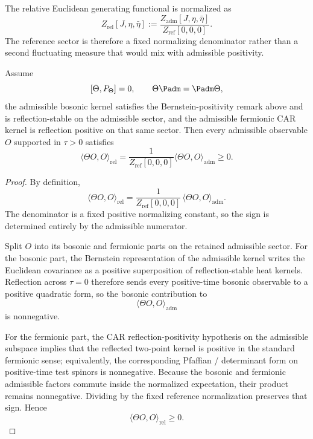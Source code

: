 \begin{definition}
\label{def:relative-generating-functional}
The relative Euclidean generating functional is normalized as
\[
Z_{\mathrm{rel}}[J,\eta,\bar\eta]
:=
\frac{Z_{\mathrm{adm}}[J,\eta,\bar\eta]}{Z_{\mathrm{ref}}[0,0,0]}.
\]
The reference sector is therefore a fixed normalizing denominator rather than a second fluctuating measure that would mix with admissible positivity.
\end{definition}

\begin{lemma}
\label{lem:admissible-reflection-positivity}
Assume
\[
[\Theta,P_\Theta]=0,
\qquad
\Theta\Padm=\Padm\Theta,
\]
the admissible bosonic kernel satisfies the Bernstein-positivity remark above and is
reflection-stable on the admissible sector, and the
admissible fermionic CAR kernel is reflection positive on that same sector. Then every
admissible observable $O$ supported in $\tau>0$ satisfies
\[
\langle \Theta O,O\rangle_{\mathrm{rel}}
=
\frac{1}{Z_{\mathrm{ref}}[0,0,0]}
\langle \Theta O,O\rangle_{\mathrm{adm}}
\ge 0.
\]
\end{lemma}

\begin{proof}
By definition,
\[
\langle \Theta O,O\rangle_{\mathrm{rel}}
=
\frac{1}{Z_{\mathrm{ref}}[0,0,0]}\,
\langle \Theta O,O\rangle_{\mathrm{adm}}.
\]
The denominator is a fixed positive normalizing constant, so the sign is determined entirely by the
admissible numerator.

Split $O$ into its bosonic and fermionic parts on the retained admissible sector. For the bosonic
part, the Bernstein representation of the admissible kernel writes the Euclidean covariance as a
positive superposition of reflection-stable heat kernels. Reflection across $\tau=0$ therefore sends
every positive-time bosonic observable to a positive quadratic form, so the bosonic contribution to
\[
\langle \Theta O,O\rangle_{\mathrm{adm}}
\]
is nonnegative.

For the fermionic part, the CAR reflection-positivity hypothesis on the admissible subspace implies
that the reflected two-point kernel is positive in the standard fermionic sense; equivalently, the
corresponding Pfaffian / determinant form on positive-time test spinors is nonnegative. Because the
bosonic and fermionic admissible factors commute inside the normalized expectation, their product
remains nonnegative. Dividing by the fixed reference normalization preserves that sign. Hence
\[
\langle \Theta O,O\rangle_{\mathrm{rel}}\ge 0.
\]
\end{proof}

